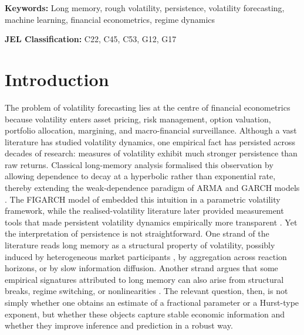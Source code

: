\documentclass[11pt,a4paper]{article}
\begin{document}
\noindent\textbf{Keywords:} Long memory, rough volatility, persistence,
volatility forecasting, machine learning, financial econometrics, regime
dynamics

\noindent\textbf{JEL Classification:} C22, C45, C53, G12, G17

\newpage
\tableofcontents
\newpage

\section{Introduction}
\label{sec:intro}

The problem of volatility forecasting lies at the centre of financial
econometrics because volatility enters asset pricing, risk management,
option valuation, portfolio allocation, margining, and macro-financial
surveillance. Although a vast literature has studied volatility dynamics,
one empirical fact has persisted across decades of research: measures of
volatility exhibit much stronger persistence than raw returns. Classical
long-memory analysis formalised this observation by allowing dependence to
decay at a hyperbolic rather than exponential rate, thereby extending the
weak-dependence paradigm of ARMA and GARCH models
\citep{granger1980introduction,hosking1981fractional,ding1993long}. The
FIGARCH model of \citet{baillie1996fractionally} embedded this intuition in
a parametric volatility framework, while the realised-volatility literature
later provided measurement tools that made persistent volatility dynamics
empirically more transparent \citep{andersen2003modeling,
barndorff2002econometric,corsi2009simple}. Yet the interpretation of
persistence is not straightforward. One strand of the literature reads
long memory as a structural property of volatility, possibly induced by
heterogeneous market participants \citep{muller1997volatilities}, by
aggregation across reaction horizons, or by slow information diffusion.
Another strand argues that some empirical signatures attributed to long
memory can also arise from structural breaks, regime switching, or
nonlinearities \citep{mikosch2004nonstationarities,gatheral2018volatility}.
The relevant question, then, is not simply whether one obtains an estimate
of a fractional parameter or a Hurst-type exponent, but whether these
objects capture stable economic information and whether they improve
inference and prediction in a robust way.
\end{document}
